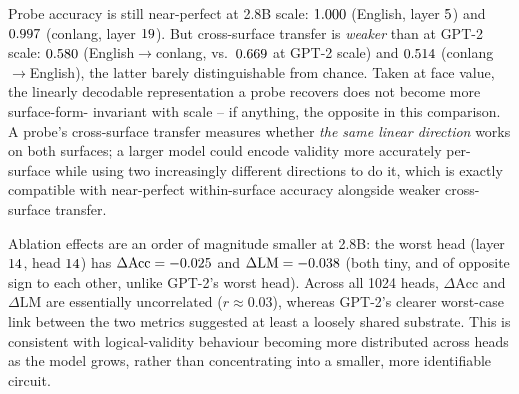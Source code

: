 Probe accuracy is still near-perfect at 2.8B scale: $1.000$
(English, layer $5$) and
$0.997$ (conlang, layer
$19$). But cross-surface transfer is
\emph{weaker} than at GPT-2 scale: $0.580$
(English$\to$conlang, vs.\ $0.669$ at GPT-2 scale) and
$0.514$ (conlang$\to$English), the latter barely
distinguishable from chance. Taken at face value, the linearly decodable
representation a probe recovers does not become more surface-form-
invariant with scale -- if anything, the opposite in this comparison. A
probe's cross-surface transfer measures whether \emph{the same linear
direction} works on both surfaces; a larger model could encode validity
more accurately per-surface while using two increasingly different
directions to do it, which is exactly compatible with near-perfect
within-surface accuracy alongside weaker cross-surface transfer.

Ablation effects are an order of magnitude smaller at 2.8B: the worst
head (layer $14$, head
$14$) has
$\Delta\text{Acc}=-0.025$ and
$\Delta\text{LM}=-0.038$ (both tiny, and of
opposite sign to each other, unlike GPT-2's worst head). Across all 1024
heads, $\Delta\text{Acc}$ and $\Delta\text{LM}$ are essentially
uncorrelated ($r\approx0.03$), whereas GPT-2's clearer worst-case link
between the two metrics suggested at least a loosely shared substrate.
This is consistent with logical-validity behaviour becoming more
distributed across heads as the model grows, rather than concentrating
into a smaller, more identifiable circuit.
